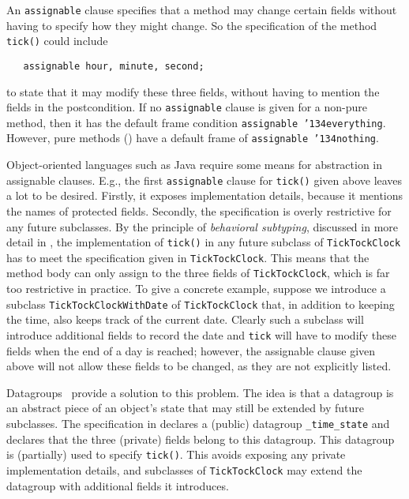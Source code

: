 \documentclass{llncs}
\def\everything{\texttt{\char'134everything}}
\def\nothing{\texttt{\char'134nothing}}
\begin{document}
An \texttt{assignable} clause specifies that a method may change certain 
fields without having to specify how they might change.
So the specification of the method \texttt{tick()} could include
\begin{verbatim}
   assignable hour, minute, second;
\end{verbatim}
to state that it may modify these three fields, without having to mention
the fields in the postcondition.
%
If no \texttt{assignable} clause is given for a non-pure method, then it has the
default frame condition \texttt{assignable \everything}.
However, pure methods () have a default frame of
\texttt{assignable \nothing}.

Object-oriented languages such as Java require some means for abstraction in
assignable clauses.  E.g., the first \texttt{assignable} clause for \texttt{tick()} given
above leaves a lot to be desired.  Firstly, it exposes implementation
details, because it mentions the names of protected fields.  Secondly, the
specification is overly restrictive for any future subclasses.  By the
principle of \emph{behavioral subtyping}, discussed in more detail in
, the implementation of \texttt{tick()} in any
future subclass of \texttt{TickTockClock} has to meet the specification given
in \texttt{TickTockClock}.  This means that the method body can only assign to the three
fields of \texttt{TickTockClock}, which is far too restrictive in practice.  
%
To give a concrete example, suppose we introduce a subclass
\texttt{Tick\-Tock\-Clock\-With\-Date} of \texttt{TickTockClock} that, in
addition to keeping the time, also keeps track of the current date.  Clearly
such a subclass will introduce additional fields to record the date and
\texttt{tick} will have to modify these fields when the end of a day is
reached; however, the assignable clause given above will not allow these
fields to be changed, as they are not explicitly listed.

Datagroups~\cite{Leino98} provide a solution to 
this problem. The idea is that a datagroup is an abstract piece of an object's
state that may still be extended by future subclasses.
The specification in  declares a (public) datagroup
\texttt{\_time\_state} and declares that the three (private) fields belong
to this datagroup. This datagroup is (partially) used to specify \texttt{tick()}.
This avoids exposing any private implementation details, and
subclasses of \texttt{TickTockClock} may extend the datagroup with
additional fields it introduces.
\end{document}
